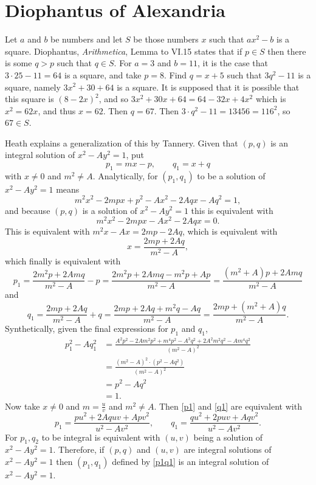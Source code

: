 \documentclass{amsart}
\theoremstyle{definition}
\begin{document}
\section{Diophantus of Alexandria}
Let $a$ and $b$ be numbers and let $S$ be those numbers $x$ such that $ax^2-b$ is a square. Diophantus, {\em Arithmetica}, Lemma to VI.15 \cite[p.~238]{diophantus}
states that if $p \in S$ then there is some $q>p$ such that $q \in S$. 
For $a=3$ and $b=11$, it is the case that $3\cdot 25-11=64$ is a square, and take $p=8$. 
Find $q=x+5$ such that $3q^2-11$ is a square, namely $3x^2+30+64$ is a square. It is supposed that it is possible that
this square is $(8-2x)^2$, and so $3x^2+30x+64=64-32x+4x^2$ which is $x^2=62x$, and thus $x=62$.   Then
$q=67$. Then $3\cdot q^2-11=13456=116^2$, so $67 \in S$. 

Heath  \cite[pp.~279--280]{diophantus} explains a generalization of this by Tannery. 
Given that $(p,q)$ is an integral solution of $x^2-Ay^2=1$,
put
\[
p_1=mx-p,\qquad q_1=x+q
\]
with $x \neq 0$ and $m^2 \neq A$.
Analytically, for $(p_1,q_1)$ to be a solution of $x^2-Ay^2=1$ means 
\[
m^2x^2-2mpx+p^2-Ax^2-2Aqx-Aq^2=1,
\]
and because $(p,q)$ is a solution of $x^2-Ay^2=1$ this is equivalent with
\[
m^2x^2-2mpx-Ax^2-2Aqx=0.
\]
This is equivalent with $m^2x-Ax=2mp-2Aq$, which is equivalent with
\[
x =  \frac{2mp+2Aq}{m^2-A},
\]
which finally is  equivalent with
\begin{equation}
p_1=\frac{2m^2p+2Amq}{m^2-A}-p=\frac{2m^2p+2Amq-m^2p+Ap}{m^2-A}
=\frac{(m^2+A)p+2Amq}{m^2-A}
\label{p1}
\end{equation}
and
\begin{equation}
q_1 =  \frac{2mp+2Aq}{m^2-A} + q = 
\frac{2mp+2Aq+m^2q-Aq}{m^2-A}
=\frac{2mp+(m^2+A)q}{m^2-A}.
\label{q1}
\end{equation}
Synthetically, given the final expressions for $p_1$ and $q_1$,
\begin{align*}
p_1^2-Aq_1^2 &= \frac{A^2p^2-2Am^2p^2+m^4p^2-A^3q^2+2A^2m^2q^2
-Am^4q^2}{(m^2-A)^2}\\
&=\frac{(m^2-A)^2 \cdot (p^2-Aq^2)}{(m^2-A)^2}\\
&=p^2-Aq^2\\
&=1.
\end{align*}
Now take $x \neq 0$ and $m=\frac{u}{v}$ and $m^2 \neq A$. 
Then \eqref{p1} and \eqref{q1} are equivalent with
\begin{equation}
p_1 = \frac{pu^2+2Aquv+Apv^2}{u^2-Av^2},\qquad
q_1 = \frac{qu^2+2puv+Aqv^2}{u^2-Av^2}.
\label{p1q1}
\end{equation}
For $p_1,q_2$ to be integral is equivalent with $(u,v)$ being a solution
of $x^2-Ay^2=1$. 
Therefore, if $(p,q)$ and $(u,v)$ are integral solutions of
$x^2-Ay^2=1$ then $(p_1,q_1)$ defined by  \eqref{p1q1} is an integral
solution of $x^2-Ay^2=1$. 
\end{document}
